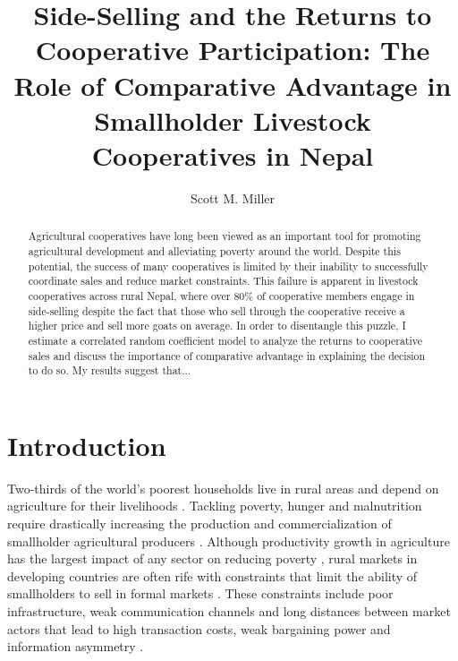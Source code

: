 \documentclass[11pt]{article}
\begin{document}



\title{Side-Selling and the Returns to Cooperative Participation: The Role of Comparative Advantage in Smallholder Livestock Cooperatives in Nepal}

\author{Scott M. Miller}
\date{}

\sloppy
\maketitle




\begin{abstract}
Agricultural cooperatives have long been viewed as an important tool for promoting agricultural development and alleviating poverty around the world. Despite this potential, the success of many cooperatives is limited by their inability to successfully coordinate sales and reduce market constraints. This failure is apparent in livestock cooperatives across rural Nepal, where over 80\% of cooperative members engage in side-selling despite the fact that those who sell through the cooperative receive a higher price and sell more goats on average. In order to disentangle this puzzle, I estimate a correlated random coefficient model to analyze the returns to cooperative sales and discuss the importance of comparative advantage in explaining the decision to do so. My results suggest that...
\end{abstract}

\clearpage
\renewcommand{\cftsecleader}{\cftdotfill{\cftdotsep}}

\tableofcontents
\clearpage

\doublespacing
\thispagestyle{plain}
\setcounter{page}{1}

\section{Introduction} \label{sec:intro}
Two-thirds of the world's poorest households live in rural areas and depend on agriculture for their livelihoods \citep{fugile-et.al.19}. Tackling poverty, hunger and malnutrition require drastically increasing the production and commercialization of smallholder agricultural producers \citep{fisher-qaim12,worldbank08}. Although productivity growth in agriculture has the largest impact of any sector on reducing poverty \citep{fugile-et.al.19}, rural markets in developing countries are often rife with constraints that limit the ability of smallholders to sell in formal markets \citep{ashby-et.al.09,kristjanson-et.al.14}. These constraints include poor infrastructure, weak communication channels and long distances between market actors that lead to high transaction costs, weak bargaining power and information asymmetry \citep{aker10,barrett.08,key.et.al.00,staal-et.al.97}. 
\end{document}
